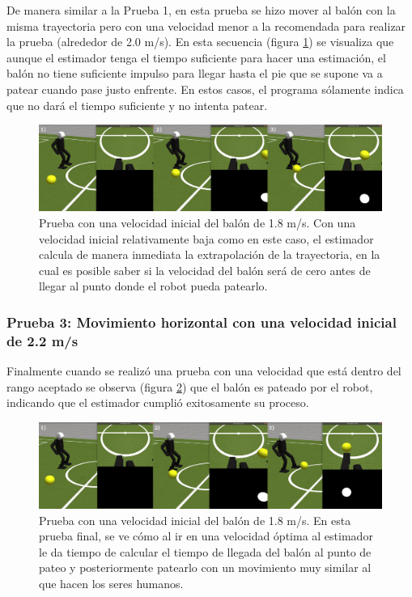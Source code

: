	De manera similar a la Prueba 1, en esta prueba se hizo mover al balón con la misma trayectoria pero con una velocidad menor a la recomendada para realizar la prueba (alrededor de 2.0 m/s). En esta secuencia (figura \ref{fig:prueba_2}) se visualiza que aunque el estimador tenga el tiempo suficiente para hacer una estimación, el balón no tiene suficiente impulso para llegar hasta el pie que se supone va a patear cuando pase justo enfrente. En estos casos, el programa sólamente indica que no dará el tiempo suficiente y no intenta patear.
\begin{figure}
\centering
	\includegraphics[scale=0.26]{images/prueba_2.png}
	\caption{Prueba con una velocidad inicial del balón de 1.8 m/s. Con una velocidad inicial relativamente baja como en este caso, el estimador calcula de manera inmediata la extrapolación de la trayectoria, en la cual es posible saber si la velocidad del balón será de cero antes de llegar al punto donde el robot pueda patearlo.}
	\label{fig:prueba_2}
\end{figure}
	
	\subsubsection*{Prueba 3: Movimiento horizontal con una velocidad inicial de 2.2 m/s}	
	
	Finalmente cuando se realizó una prueba con una velocidad que está dentro del rango aceptado se observa (figura \ref{fig:prueba_3}) que el balón es pateado por el robot, indicando que el estimador cumplió exitosamente su proceso.
\begin{figure}
\centering
	\includegraphics[scale=0.26]{images/prueba_3.png}
	\caption{Prueba con una velocidad inicial del balón de 1.8 m/s. En esta prueba final, se ve cómo al ir en una velocidad óptima al estimador le da tiempo de calcular el tiempo de llegada del balón al punto de pateo y posteriormente patearlo con un movimiento muy similar al que hacen los seres humanos.}
	\label{fig:prueba_3}
\end{figure}
	
